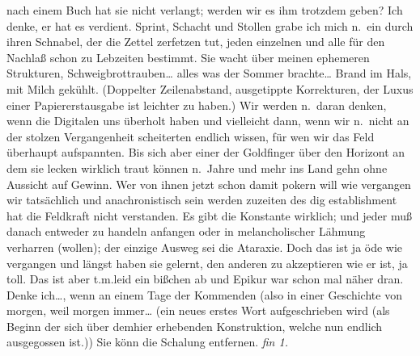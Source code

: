 \documentclass[
]{article}
\begin{document}
nach einem Buch hat sie nicht verlangt; werden wir es ihm trotzdem
geben? Ich denke, er hat es verdient. Sprint, Schacht und Stollen grabe
ich mich n.~ein durch ihren Schnabel, der die Zettel zerfetzen tut,
jeden einzelnen und alle für den Nachlaß schon zu Lebzeiten bestimmt.
Sie wacht über meinen ephemeren Strukturen, Schweigbrottrauben\ldots{}
alles was der Sommer brachte\ldots{} Brand im Hals, mit Milch gekühlt.
(Doppelter Zeilenabstand, ausgetippte Korrekturen, der Luxus einer
Papiererstausgabe ist leichter zu haben.) Wir werden n.~daran denken,
wenn die Digitalen uns überholt haben und vielleicht dann, wenn wir
n.~nicht an der stolzen Vergangenheit scheiterten endlich wissen, für
wen wir das Feld überhaupt aufspannten. Bis sich aber einer der
Goldfinger über den Horizont an dem sie lecken wirklich traut können
n.~Jahre und mehr ins Land gehn ohne Aussicht auf Gewinn. Wer von ihnen
jetzt schon damit pokern will wie vergangen wir tatsächlich und
anachronistisch sein werden zuzeiten des dig establishment hat die
Feldkraft nicht verstanden. Es gibt die Konstante wirklich; und jeder
muß danach entweder zu handeln anfangen oder in melancholischer Lähmung
verharren (wollen); der einzige Ausweg sei die Ataraxie. Doch das ist ja
öde wie vergangen und längst haben sie gelernt, den anderen zu
akzeptieren wie er ist, ja toll. Das ist aber t.m.leid ein bißchen ab
und Epikur war schon mal näher dran. Denke ich\ldots, wenn an einem Tage
der Kommenden (also in einer Geschichte von morgen, weil morgen
immer\ldots{} (ein neues erstes Wort aufgeschrieben wird (als Beginn der
sich über demhier erhebenden Konstruktion, welche nun endlich
ausgegossen ist.)) Sie könn die Schalung entfernen. \emph{fin 1.}
\end{document}
